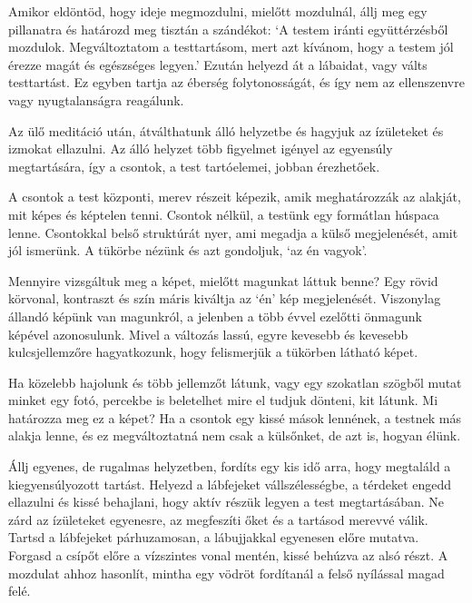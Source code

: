 Amikor eldöntöd, hogy ideje megmozdulni, mielőtt mozdulnál, állj meg egy
pillanatra és határozd meg tisztán a szándékot: `A testem iránti
együttérzésből mozdulok. Megváltoztatom a testtartásom, mert azt
kívánom, hogy a testem jól érezze magát és egészséges legyen.' Ezután
helyezd át a lábaidat, vagy válts testtartást. Ez egyben tartja az
éberség folytonosságát, és így nem az ellenszenvre vagy nyugtalanságra
reagálunk.


Az ülő meditáció után, átválthatunk álló helyzetbe és hagyjuk az
ízületeket és izmokat ellazulni. Az álló helyzet több figyelmet igényel
az egyensúly megtartására, így a csontok, a test tartóelemei, jobban
érezhetőek.

A csontok a test központi, merev részeit képezik, amik meghatározzák az
alakját, mit képes és képtelen tenni. Csontok nélkül, a testünk egy
formátlan húspaca lenne. Csontokkal belső struktúrát nyer, ami megadja a
külső megjelenését, amit jól ismerünk. A tükörbe nézünk és azt
gondoljuk, `az én vagyok'.

\enlargethispage*{\baselineskip}

Mennyire vizsgáltuk meg a képet, mielőtt magunkat láttuk benne? Egy
rövid körvonal, kontraszt és szín máris kiváltja az `én' kép
megjelenését. Viszonylag állandó képünk van magunkról, a jelenben a több
évvel ezelőtti önmagunk képével azonosulunk. Mivel a változás lassú,
egyre kevesebb és kevesebb kulcsjellemzőre hagyatkozunk, hogy
felismerjük a tükörben látható képet.

Ha közelebb hajolunk és több jellemzőt látunk, vagy egy szokatlan
szögből mutat minket egy fotó, percekbe is beletelhet mire el tudjuk
dönteni, kit látunk. Mi határozza meg ez a képet? Ha a csontok egy kissé
mások lennének, a testnek más alakja lenne, és ez megváltoztatná nem
csak a külsőnket, de azt is, hogyan élünk.


Állj egyenes, de rugalmas helyzetben, fordíts egy kis idő arra, hogy
megtaláld a kiegyensúlyozott tartást. Helyezd a lábfejeket
vállszélességbe, a térdeket engedd ellazulni és kissé behajlani, hogy
aktív részük legyen a test megtartásában. Ne zárd az ízületeket
egyenesre, az megfeszíti őket és a tartásod merevvé válik. Tartsd a
lábfejeket párhuzamosan, a lábujjakkal egyenesen előre mutatva. Forgasd
a csípőt előre a vízszintes vonal mentén, kissé behúzva az alsó részt. A
mozdulat ahhoz hasonlít, mintha egy vödröt fordítanál a felső nyílással
magad felé.

